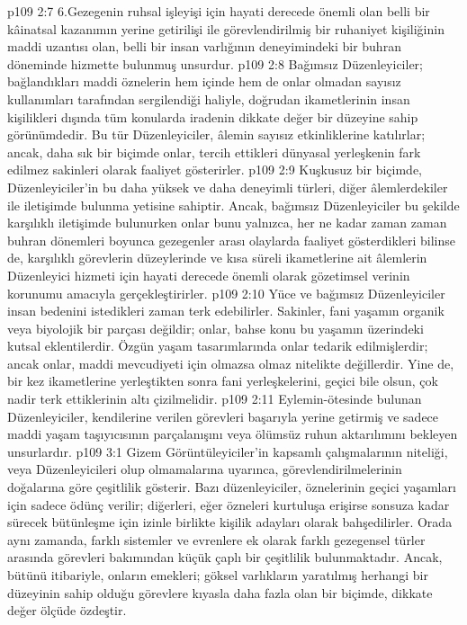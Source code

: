 \vs p109 2:7 6.\bibnobreakspace Gezegenin ruhsal işleyişi için hayati derecede önemli olan belli bir kâinatsal kazanımın yerine getirilişi ile görevlendirilmiş bir ruhaniyet kişiliğinin maddi uzantısı olan, belli bir insan varlığının deneyimindeki bir buhran döneminde hizmette bulunmuş unsurdur.
\vs p109 2:8 Bağımsız Düzenleyiciler; bağlandıkları maddi öznelerin hem içinde hem de onlar olmadan sayısız kullanımları tarafından sergilendiği haliyle, doğrudan ikametlerinin insan kişilikleri dışında tüm konularda iradenin dikkate değer bir düzeyine sahip görünümdedir. Bu tür Düzenleyiciler, âlemin sayısız etkinliklerine katılırlar; ancak, daha sık bir biçimde onlar, tercih ettikleri dünyasal yerleşkenin fark edilmez sakinleri olarak faaliyet gösterirler.
\vs p109 2:9 Kuşkusuz bir biçimde, Düzenleyiciler’in bu daha yüksek ve daha deneyimli türleri, diğer âlemlerdekiler ile iletişimde bulunma yetisine sahiptir. Ancak, bağımsız Düzenleyiciler bu şekilde karşılıklı iletişimde bulunurken onlar bunu yalnızca, her ne kadar zaman zaman buhran dönemleri boyunca gezegenler arası olaylarda faaliyet gösterdikleri bilinse de, karşılıklı görevlerin düzeylerinde ve kısa süreli ikametlerine ait âlemlerin Düzenleyici hizmeti için hayati derecede önemli olarak gözetimsel verinin korunumu amacıyla gerçekleştirirler.
\vs p109 2:10 Yüce ve bağımsız Düzenleyiciler insan bedenini istedikleri zaman terk edebilirler. Sakinler, fani yaşamın organik veya biyolojik bir parçası değildir; onlar, bahse konu bu yaşamın üzerindeki kutsal eklentilerdir. Özgün yaşam tasarımlarında onlar tedarik edilmişlerdir; ancak onlar, maddi mevcudiyeti için olmazsa olmaz nitelikte değillerdir. Yine de, bir kez ikametlerine yerleştikten sonra fani yerleşkelerini, geçici bile olsun, çok nadir terk ettiklerinin altı çizilmelidir.
\vs p109 2:11 Eylemin\hyp{}ötesinde bulunan Düzenleyiciler, kendilerine verilen görevleri başarıyla yerine getirmiş ve sadece maddi yaşam taşıyıcısının parçalanışını veya ölümsüz ruhun aktarılımını bekleyen unsurlardır.
\vs p109 3:1 Gizem Görüntüleyiciler’in kapsamlı çalışmalarının niteliği,  veya  Düzenleyicileri olup olmamalarına uyarınca, görevlendirilmelerinin doğalarına göre çeşitlilik gösterir. Bazı düzenleyiciler, öznelerinin geçici yaşamları için sadece ödünç verilir; diğerleri, eğer özneleri kurtuluşa erişirse sonsuza kadar sürecek bütünleşme için izinle birlikte kişilik adayları olarak bahşedilirler. Orada aynı zamanda, farklı sistemler ve evrenlere ek olarak farklı gezegensel türler arasında görevleri bakımından küçük çaplı bir çeşitlilik bulunmaktadır. Ancak, bütünü itibariyle, onların emekleri; göksel varlıkların yaratılmış herhangi bir düzeyinin sahip olduğu görevlere kıyasla daha fazla olan bir biçimde, dikkate değer ölçüde özdeştir.
